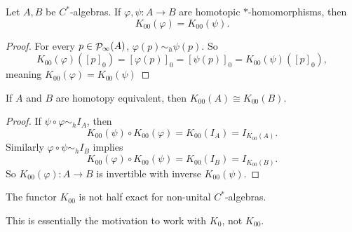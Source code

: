 \begin{proposition} \label{homotopyInvarianceK00}
Let $A,B$ be $C^*$-algebras. If $\varphi,\psi:A\to B$ are homotopic $*$-homomorphisms, then 
\[ K_{00}(\varphi) = K_{00}(\psi). \]
\end{proposition}
\begin{proof}
For every $p\in\mathop{\mathcal{P}}\nolimits_\infty(A)$, $\varphi(p)\sim_h \psi(p)$. So
\[ K_{00}(\varphi)([p]_0) = [\varphi(p)]_0 = [\psi(p)]_0 = K_{00}(\psi)([p]_0), \]
meaning $K_{00}(\varphi) = K_{00}(\psi)$
\end{proof}
\begin{corollary}
If $A$ and $B$ are homotopy equivalent, then $K_{00}(A)\cong K_{00}(B)$.
\end{corollary}
\begin{proof}
If $\psi\circ\varphi \sim_h I_A$, then
\[ K_{00}(\psi)\circ K_{00}(\varphi) = K_{00}(I_A) = I_{K_{00}(A)}. \]
Similarly $\varphi\circ\psi \sim_h I_B$ implies
\[ K_{00}(\varphi)\circ K_{00}(\psi) = K_{00}(I_B) = I_{K_{00}(B)}. \]
So $K_{00}(\varphi): A\to B$ is invertible with inverse $K_{00}(\psi)$.
\end{proof}

\begin{proposition}
The functor $K_{00}$ is not half exact for non-unital $C^*$-algebras.
\end{proposition}
This is essentially the motivation to work with $K_0$, not $K_{00}$.

